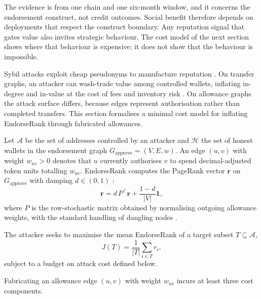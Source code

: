 The evidence is from one chain and one six-month window, and it concerns the endorsement construct, not credit outcomes. Social benefit therefore depends on deployments that respect the construct boundary. Any reputation signal that gates value also invites strategic behaviour. The cost model of the next section shows where that behaviour is expensive; it does not show that the behaviour is impossible.


Sybil attacks exploit cheap pseudonyms to manufacture reputation . On transfer graphs, an attacker can wash-trade value among controlled wallets, inflating in-degree and in-value at the cost of fees and inventory risk . On allowance graphs the attack surface differs, because edges represent authorisation rather than completed transfers. This section formalises a minimal cost model for inflating EndorseRank through fabricated allowances.


Let $\mathcal{A}$ be the set of addresses controlled by an attacker and $\mathcal{H}$ the set of honest wallets in the endorsement graph $G_{\text{approve}}=(V,E,w)$. An edge $(u,v)$ with weight $w_{uv}>0$ denotes that $u$ currently authorises $v$ to spend decimal-adjusted token units totalling $w_{uv}$. EndorseRank computes the PageRank vector $\mathbf{r}$ on $G_{\text{approve}}$ with damping $d\in(0,1)$ :
\begin{equation}
\label{eq:pagerank-sybil}
\mathbf{r} = d\, P^{\top} \mathbf{r} + \frac{1-d}{|V|}\mathbf{1},
\end{equation}
where $P$ is the row-stochastic matrix obtained by normalising outgoing allowance weights, with the standard handling of dangling nodes .

The attacker seeks to maximise the mean EndorseRank of a target subset $T\subseteq\mathcal{A}$,
\begin{equation}
\label{eq:objective}
J(T) = \frac{1}{|T|}\sum_{i\in T} r_i,
\end{equation}
subject to a budget on attack cost defined below.


Fabricating an allowance edge $(u,v)$ with weight $w_{uv}$ incurs at least three cost components.

